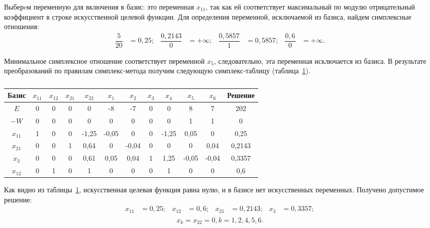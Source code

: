 Выберeм переменную для включения в базис: это переменная $ x_{11} $, так как
ей соответствует максимальный по модулю отрицательный коэффициент в
строке искусственной целевой функции.
Для определения переменной, исключаемой из базиса, найдем
симплексные отношения:
\begin{align}
  \dfrac{5}{20} & = 0{,}25; &
  \dfrac{0{,}2143}{0} & = +\infty; &
  \dfrac{0{,}5857}{1} & = 0{,}5857; &
  \dfrac{0{,}6}{0} & = +\infty.
\end{align}

Минимальное симплексное отношение соответствует переменной $ x_{5} $, следовательно,
эта переменная исключается из базиса.
В результате преобразований по правилам симплекс-метода получим 
следующую симплекс-таблицу (таблица~\ref{tbl:Simplex1_4}).

\renewcommand{\tabcolsep}{0.35em}
\begin{table}[h]
  \centering
    \caption{\label{tbl:Simplex1_4}}
    \begin{tabular}{|c|c|c|c|c|c|c|c|c|c|c|c|}
      \hline
      Базис & $ x_{11} $ & $ x_{12} $ & $ x_{21} $ & $ x_{22} $ & $ x_{1} $ & $ x_{2} $ & $ x_{3} $ & $ x_{4} $ & $ x_{5} $ & $ x_{6} $ & Решение \\  
      \hline
      $ E $ & 0 & 0 & 0 & 0 & -8 & -7 & 0 & 0 & 8 & 7 & 202 \\  
      \hline
      $ -W $ & 0 & 0 & 0 & 0 & 0 & 0 & 0 & 0 & 1 & 1 & 0 \\  
      \hline
      $ x_{11} $ & 1 & 0 & 0 & -1{,}25 & -0{,}05 & 0 & 0 & -1{,}25 & 0{,}05 & 0 & 0{,}25 \\  
      \hline
      $ x_{21} $ & 0 & 0 & 1 & 0{,}64 & 0 & -0{,}04 & 0 & 0 & 0 & 0{,}04 & 0{,}2143 \\  
      \hline
      $ x_{3} $ & 0 & 0 & 0 & 0{,}61 & 0{,}05 & 0{,}04 & 1 & 1{,}25 & -0{,}05 & -0{,}04 & 0{,}3357 \\  
      \hline
      $ x_{12} $ & 0 & 1 & 0 & 1 & 0 & 0 & 0 & 1 & 0 & 0 & 0{,}6 \\  
      \hline
    \end{tabular}
\end{table}

Как видно из таблицы~\ref{tbl:Simplex1_4}, искусственная целевая функция равна нулю, и в
базисе нет искусственных переменных. Получено допустимое решение:
\begin{equation}
    \begin{aligned}
      x_{11} &= 0{,}25; &
      x_{12} &= 0{,}6; &
      x_{21} &= 0{,}2143; &
      x_{3} &= 0{,}3357; \\
    \end{aligned}
\end{equation}
\begin{equation}
  x_{k} = x_{22} = 0, k=1,2,4,5,6.
\end{equation}

